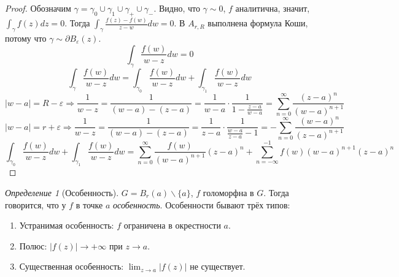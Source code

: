 \documentclass[12pt]{article}
\newcommand{\union}{\cup}
\newcommand{\Ra}{\Rightarrow}
\newcounter{cnt}
\theoremstyle{thmnote}
\theoremstyle{remark}
\theoremstyle{defnote}
\newtheorem{definition}[cnt]{Определение}
\begin{document}
\begin{proof}
    Обозначим $\gamma = \gamma_0 \union \gamma_1 \union \gamma_+ \union \gamma_-$. Видно, что $\gamma \sim 0$, $f$ аналитична, значит, $\int_{\gamma} f(z)dz = 0$. Тогда $\int_{\gamma} \frac{f(z) - f(w)}{z - w}dw = 0$. В $A_{r, R}$ выполнена формула Коши, потому что $\gamma \sim \partial B_{\varepsilon}(z)$.
    \begin{equation*}
        \int_{\gamma} \frac{f(w)}{w - z} dw = 0
    \end{equation*}
    \begin{equation*}
        \int_{\gamma} \frac{f(w)}{w - z} dw = \int_{\gamma_0} \frac{f(w)}{w - z}dw + \int_{\gamma_1} \frac{f(w)}{w - z}dw
    \end{equation*}
    \begin{equation*}
        |w - a| = R - \varepsilon \Ra \frac{1}{w - z} = \frac{1}{(w - a) - (z - a)} = \frac{1}{w - a} \cdot \frac{1}{1 - \frac{z - a}{w - a}} = \underset{n = 0}{\overset{\infty}{\sum}} \frac{(z - a)^n}{(w - a)^{n+1}}
    \end{equation*}
    \begin{equation*}
        |w - a| = r + \varepsilon \Ra \frac{1}{w - z} = \frac{1}{(w - a) - (z - a)} = \frac{1}{z - a} \cdot \frac{1}{\frac{w - a}{z - a} - 1} = - \underset{n = 0}{\overset{\infty}{\sum}} \frac{(w - a)^n}{(z - a)^{n+1}}
    \end{equation*}
    \begin{equation*}
        \int_{\gamma_0} \frac{f(w)}{w - z}dw + \int_{\gamma_1} \frac{f(w)}{w - z}dw = \underset{n = 0}{\overset{\infty}{\sum}} \frac{f(w)}{(w - a)^{n+1}}(z - a)^n + \underset{n = -\infty}{\overset{-1}{\sum}} f(w) (w - a)^{n+1} (z - a)^n
    \end{equation*}
\end{proof}

\begin{definition}[Особенность]
    $G = B_r(a) \backslash \{a\}$, $f$ голоморфна в $G$. Тогда говорится, что у $f$ в точке $a$ \textit{особенность}. Особенности бывают трёх типов:
    \begin{enumerate}
        \item Устранимая особенность: $f$ ограничена в окрестности $a$.
        \item Полюс: $|f(z)| \to +\infty$ при $z \to a$.
        \item Существенная особенность: $\lim_{z \to a} |f(z)|$ не существует.
    \end{enumerate}
\end{definition}
\end{document}
